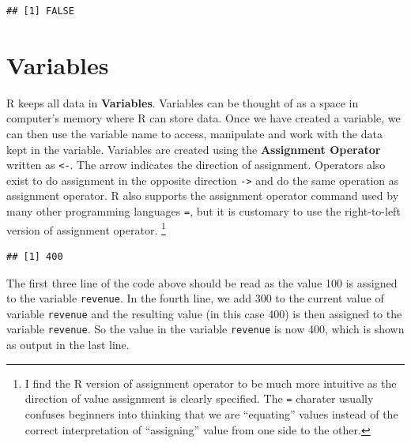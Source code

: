 \documentclass[]{krantz}
\makeatletter
\newenvironment{Shaded}{\begin{snugshade}}{\end{snugshade}}
\newcommand{\KeywordTok}[1]{\textcolor[rgb]{0.27,0.27,0.27}{\textbf{#1}}}
\newcommand{\DecValTok}[1]{\textcolor[rgb]{0.06,0.06,0.06}{#1}}
\newcommand{\StringTok}[1]{\textcolor[rgb]{0.5,0.5,0.5}{#1}}
\newcommand{\CommentTok}[1]{\textcolor[rgb]{0.56,0.35,0.01}{\textit{#1}}}
\newcommand{\OperatorTok}[1]{\textcolor[rgb]{0.81,0.36,0.00}{\textbf{#1}}}
\newcommand{\NormalTok}[1]{#1}
\newenvironment{kframe}{%
\medskip{}
\setlength{\fboxsep}{.8em}
 \def\at@end@of@kframe{}%
 \ifinner\ifhmode%
  \def\at@end@of@kframe{\end{minipage}}%
  \begin{minipage}{\columnwidth}%
 \fi\fi%
 \def\FrameCommand##1{\hskip\@totalleftmargin \hskip-\fboxsep
 \colorbox{shadecolor}{##1}\hskip-\fboxsep
     \hskip-\linewidth \hskip-\@totalleftmargin \hskip\columnwidth}%
 \MakeFramed {\advance\hsize-\width
   \@totalleftmargin\z@ \linewidth\hsize
   \@setminipage}}%
 {\par\unskip\endMakeFramed%
 \at@end@of@kframe}
\renewenvironment{Shaded}{\begin{kframe}}{\end{kframe}}
\theoremstyle{definition}
\theoremstyle{definition}
\theoremstyle{definition}
\theoremstyle{remark}
\makeatother
\begin{document}
\begin{verbatim}
## [1] FALSE
\end{verbatim}

\section{Variables}\label{variables}

R keeps all data in \textbf{Variables}. Variables can be thought of as a
space in computer's memory where R can store data. Once we have created
a variable, we can then use the variable name to access, manipulate and
work with the data kept in the variable. Variables are created using the
\textbf{Assignment Operator} written as \texttt{\textless{}-}. The arrow
indicates the direction of assignment. Operators also exist to do
assignment in the opposite direction \texttt{-\textgreater{}} and do the
same operation as assignment operator. R also supports the assignment
operator command used by many other programming languages \texttt{=},
but it is customary to use the right-to-left version of assignment
operator. \footnote{I find the R version of assignment operator to be
  much more intuitive as the direction of value assignment is clearly
  specified. The \texttt{=} charater usually confuses beginners into
  thinking that we are ``equating'' values instead of the correct
  interpretation of ``assigning'' value from one side to the other.}

\begin{Shaded}
\end{Shaded}

\begin{verbatim}
## [1] 400
\end{verbatim}

The first three line of the code above should be read as the value 100
is assigned to the variable \texttt{revenue}. In the fourth line, we add
300 to the current value of variable \texttt{revenue} and the resulting
value (in this case 400) is then assigned to the variable
\texttt{revenue}. So the value in the variable \texttt{revenue} is now
400, which is shown as output in the last line.
\end{document}
